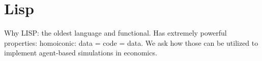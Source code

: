 
\chapter{Lisp} 
Why LISP: the oldest language and functional. Has extremely powerful properties: homoiconic: data = code = data. We ask how those can be utilized to implement agent-based simulations in economics.

